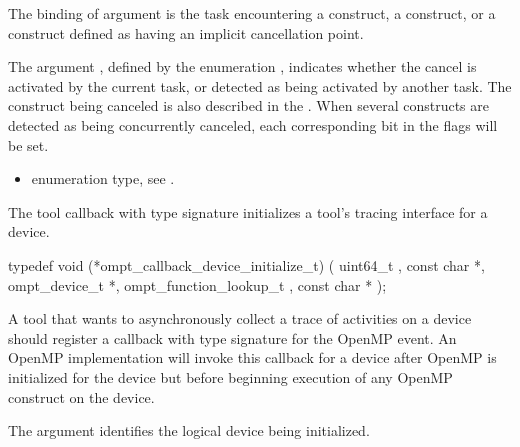\argdesc

The binding of argument  is the task
encountering a  construct, a 
construct, or a construct defined as having an implicit cancellation
point.

The argument , defined by the enumeration
, indicates whether the cancel is
activated by the current task, or detected as being activated by
another task.  The construct being canceled is also described in the
. When several constructs are detected as being
concurrently canceled, each corresponding bit in the flags will be
set.

\codeptrdesc

\crossreferences
\begin{itemize}
\item {} enumeration type, see .
\end{itemize}


\label{sec:ompt_callback_device_initialize_t}

\summary The tool callback with type signature
 initializes a
tool's tracing interface for a device.

\format

\begin{ccppspecific}
\begin{omptCallback}
typedef void (*ompt_callback_device_initialize_t) (
  uint64_t ,
  const char *,
  ompt_device_t *,
  ompt_function_lookup_t ,
  const char *
);
\end{omptCallback}
\end{ccppspecific}


\descr

A tool that wants to asynchronously collect a trace of
activities on a device should register a callback with type signature
 for the
 OpenMP event. An OpenMP
implementation will invoke this callback for a device after OpenMP is
initialized for the device but before beginning execution of any
OpenMP construct on the device.

\argdesc

The argument  identifies the logical device
being initialized.

